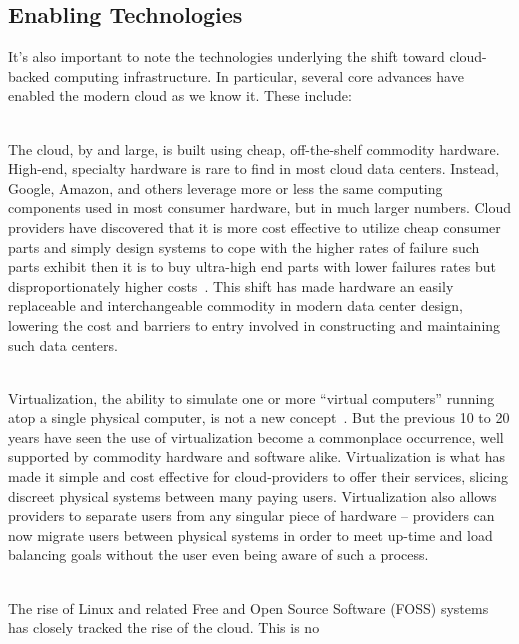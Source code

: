 \subsection{Enabling Technologies}

It's also important to note the technologies underlying the shift
toward cloud-backed computing infrastructure. In particular, several
core advances have enabled the modern cloud as we know it. These
include:

\begin{packed_desc}
\item[Commoditization of Hardware] \hfill \\ The cloud, by and large,
  is built using cheap, off-the-shelf commodity hardware. High-end,
  specialty hardware is rare to find in most cloud data
  centers. Instead, Google, Amazon, and others leverage more or less
  the same computing components used in most consumer hardware, but in
  much larger numbers. Cloud providers have discovered that it is more
  cost effective to utilize cheap consumer parts and simply design
  systems to cope with the higher rates of failure such parts exhibit
  then it is to buy ultra-high end parts with lower failures rates but
  disproportionately higher costs~\cite{atwood2007}. This shift has
  made hardware an easily replaceable and interchangeable commodity in
  modern data center design, lowering the cost and barriers to entry
  involved in constructing and maintaining such data centers.
\item[Virtualization] \hfill \\ Virtualization, the ability to
  simulate one or more ``virtual computers'' running atop a single
  physical computer, is not a new concept~\cite{goldberg1974}. But the
  previous 10 to 20 years have seen the use of virtualization become a
  commonplace occurrence, well supported by commodity hardware and
  software alike. Virtualization is what has made it simple and cost
  effective for cloud-providers to offer their services, slicing
  discreet physical systems between many paying users. Virtualization
  also allows providers to separate users from any singular piece of
  hardware -- providers can now migrate users between physical systems
  in order to meet up-time and load balancing goals without the user
  even being aware of such a process.
\item[Free and Open Source Software (and Hardware)] \hfill \\ The rise
  of Linux and related Free and Open Source Software (FOSS) systems
  has closely tracked the rise of the cloud. This is no

\end{packed_desc}

